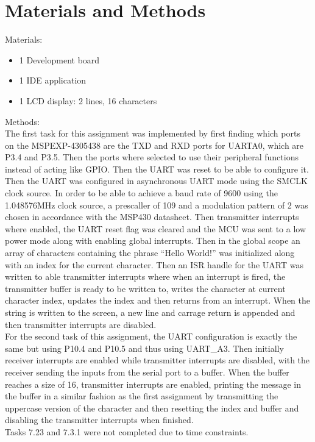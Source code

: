 \documentclass[journal]{IEEEtran}
\begin{document}
\section{Materials and Methods}
Materials:
\begin{itemize}
  \item 1 Development board
  \item 1 IDE application
  \item 1 LCD display: 2 lines, 16 characters
\end{itemize}
Methods:\\
The first task for this assignment was implemented by first finding which ports on the MSPEXP-4305438 are the TXD and RXD ports for UARTA0, which are P3.4 and P3.5. Then the ports where selected to use their peripheral functions instead of acting like GPIO. Then the UART was reset to be able to configure it. Then the UART was configured in asynchronous UART mode using the SMCLK clock source. In order to be able to achieve a baud rate of 9600 using the 1.048576\si{\mega\hertz} clock source, a prescaller of 109 and a modulation pattern of 2 was chosen in accordance with the MSP430 datasheet. Then transmitter interrupts where enabled, the UART reset flag was cleared and the MCU was sent to a low power mode along with enabling global interrupts. Then in the global scope an array of characters containing the phrase ``Hello World!''  was initialized along with an index for the current character. Then an ISR handle for the UART was written to able transmitter interrupts where when an interrupt is fired, the transmitter buffer is ready to be written to, writes the character at current character index, updates the index and then returns from an interrupt. When the string is written to the screen, a new line and carrage return is appended and then transmitter interrupts are disabled.\\
For the second task of this assignment, the UART configuration is exactly the same but using P10.4 and P10.5 and thus using UART\_A3. Then initially receiver interrupts are enabled while transmitter interrupts are disabled, with the receiver sending the inputs from the serial port to a buffer. When the buffer reaches a size of 16, transmitter interrupts are enabled, printing the message in the buffer in a similar fashion as the first assignment by transmitting the uppercase version of the character and then resetting the index and buffer and disabling the transmitter interrupts when finished.\\
Tasks 7.23 and 7.3.1 were not completed due to time constraints.
\end{document}
